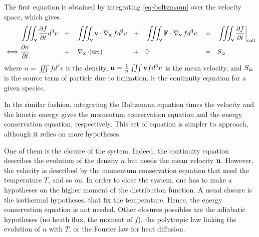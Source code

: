 The first equation is obtained by integrating \cref{eq-boltzmann} over the velocity space, which gives
\begin{align}
    & \iiint_{{\mathbf v}}  \frac{\partial f}{\partial t} d^3v &&+&& \iiint_{{\mathbf v}}  {\mathbf v} \cdot \operatorname{{\mathbf \nabla}}_{{\mathbf x}} f  d^3v &&+&&  \iiint_{{\mathbf v}}  {\mathbf F} \cdot  \operatorname{{\mathbf \nabla}}_{{\mathbf v}} f  d^3v && = && \iiint_{{\mathbf v}}  \frac{\partial f}{\partial t}  \bigg\vert_{\rm coll}  \nonumber  \\ 
   \iff &  \frac{\partial n}{\partial t} &&+&&  \operatorname{{\mathbf \nabla}}_{{\mathbf x}}  \cdot  ( {\mathbf u} n) &&+&& 0 &&=&& S_{\rm iz}   \label{eq-conc}
\end{align} 
where $n=\iiint f d^3v$ is the density, ${\mathbf u} = \frac{1}{n} \iiint {\mathbf v} f d^3v$ is the mean velocity, and $S_{\rm iz}$ is the source term of particle due to ionization.
 is the continuity equation for a given species.

In the similar fashion, integrating the Boltzmann equation times the velocity and the kinetic energy gives the momentum conservation equation and the energy conservation equation, respectively.
This set of equation is simpler to approach, although it relies on more hypotheses.

One of them is the closure of the system.
Indeed, the continuity equation describes the evolution of the density $n$ but needs the mean velocity ${\mathbf u}$.
However, the velocity is described by the momentum conservation equation that need the temperature $T$, and so on.
In order to close the system, one has to make a hypotheses on the higher moment of the distribution function.
A usual closure is the isothermal hypotheses, that fix the temperature. 
Hence, the energy conservation equation is not needed.
Other closures possibles are the adiabatic hypotheses (no heath flux, the  moment of $f$), the polytropic law linking the evolution of $n$ with $T$, or the Fourier law for heat diffusion.


